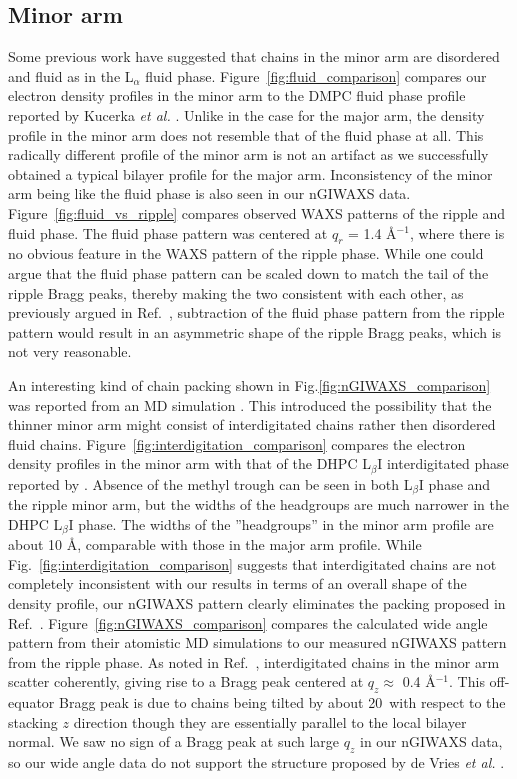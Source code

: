 \subsection{Minor arm}
Some previous work have suggested that chains in the minor arm are disordered 
and fluid as in the L$_\alpha$ fluid phase.
Figure~\ref{fig:fluid_comparison} compares our electron density profiles
in the minor arm to the DMPC fluid phase profile reported by 
Kucerka \textit{et al.} \cite{Kucerka05_BPJ}.
Unlike in the case for the major arm, the density profile in the minor arm
does not resemble that of the fluid phase at all. This radically different
profile of the minor arm is not an artifact as we successfully obtained 
a typical bilayer profile for the major arm.
Inconsistency of the minor arm being like the fluid phase is also seen in our nGIWAXS data.
Figure~\ref{fig:fluid_vs_ripple} compares observed WAXS patterns of the ripple and 
fluid phase. The fluid phase pattern was centered at $q_r$ = 1.4 \AA$^{-1}$, where
there is no obvious feature in the WAXS pattern of the ripple phase. While one
could argue that the fluid phase pattern can be scaled down to match the tail
of the ripple Bragg peaks, thereby making the two consistent with each other, 
as previously argued in Ref.~\cite{ref:Cunningham98}, 
subtraction of the fluid phase pattern from the ripple pattern would result
in an asymmetric shape of the ripple Bragg peaks, which is not very reasonable.

An interesting kind of chain packing shown in Fig.\ref{fig:nGIWAXS_comparison} was reported from an MD simulation \cite{ref:deVries05}. This introduced the possibility that the thinner minor arm might consist of interdigitated chains rather then disordered fluid chains.  
Figure~\ref{fig:interdigitation_comparison} compares the electron density
profiles in the minor arm with that of the DHPC L$_\beta\text{I}$ interdigitated phase
reported by \cite{ref:Guler09}. Absence of the methyl trough can be seen in
both L$_\beta\text{I}$ phase and the ripple minor arm, but the widths of the
headgroups are much narrower in the DHPC L$_\beta\text{I}$ phase. The widths
of the ''headgroups'' in the minor arm profile are about 10 \AA, comparable
with those in the major arm profile. While Fig.~\ref{fig:interdigitation_comparison}
suggests that interdigitated chains are not completely inconsistent with 
our results in terms of an overall shape of the density profile, 
our nGIWAXS pattern clearly eliminates the packing proposed in 
Ref.~\cite{ref:deVries05}. Figure~\ref{fig:nGIWAXS_comparison} compares
the calculated wide angle pattern from their atomistic MD simulations
to our measured nGIWAXS pattern from the ripple phase. As noted in
Ref.~\cite{ref:deVries05}, interdigitated chains in the minor arm scatter
coherently, giving rise to a Bragg peak centered at $q_z \approx$ 0.4 \AA$^{-1}$.
This off-equator Bragg peak is due to chains being tilted by about 20\textdegree\
with respect to the stacking $z$ direction though they
are essentially parallel to the local bilayer normal.
We saw no sign of a Bragg peak at such large $q_z$ in our nGIWAXS
data, so our wide angle data do not support the structure proposed by
de Vries \textit{et al.} \cite{ref:deVries05}.


